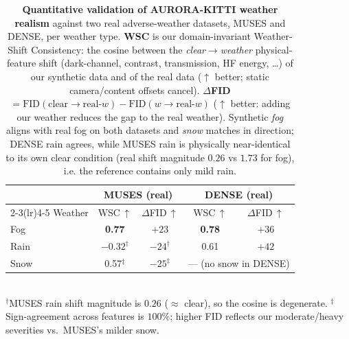 \begin{table}[t]
  \centering
  \small
  \setlength{\tabcolsep}{5pt}
  \caption{\textbf{Quantitative validation of AURORA-KITTI weather realism} against two real
  adverse-weather datasets, MUSES and DENSE, per weather type. \textbf{WSC} is our domain-invariant
  Weather-Shift Consistency: the cosine between the \emph{clear$\to$weather} physical-feature shift
  (dark-channel, contrast, transmission, HF energy, \dots) of our synthetic data and of the real data
  ($\uparrow$ better; static camera/content offsets cancel). \textbf{$\Delta$FID} $=
  \mathrm{FID}(\text{clear}\!\to\!\text{real-}w)-\mathrm{FID}(w\!\to\!\text{real-}w)$ ($\uparrow$ better:
  adding our weather reduces the gap to the real weather). Synthetic \emph{fog} aligns with real fog on
  both datasets and \emph{snow} matches in direction; DENSE rain agrees, while MUSES rain is physically
  near-identical to its own clear condition (real shift magnitude $0.26$ vs $1.73$ for fog), i.e. the
  reference contains only mild rain.}
  \begin{tabular}{l cc cc}
    \toprule
    & \multicolumn{2}{c}{\textbf{MUSES} (real)} & \multicolumn{2}{c}{\textbf{DENSE} (real)} \\
    \cmidrule(lr){2-3}\cmidrule(lr){4-5}
    Weather & WSC\,$\uparrow$ & $\Delta$FID\,$\uparrow$ & WSC\,$\uparrow$ & $\Delta$FID\,$\uparrow$ \\
    \midrule
    Fog  & \textbf{0.77} & $+23$ & \textbf{0.78} & $+36$ \\
    Rain & $-0.32^{\dagger}$ & $-24^{\dagger}$ & 0.61 & $+42$ \\
    Snow & 0.57$^{\ddagger}$ & $-25^{\ddagger}$ & \multicolumn{2}{c}{— (no snow in DENSE)} \\
    \bottomrule
  \end{tabular}
  \\[2pt]
  {\footnotesize $^{\dagger}$MUSES rain shift magnitude is $0.26$ ($\approx$ clear), so the cosine is
  degenerate. $^{\ddagger}$Sign-agreement across features is $100\%$; higher FID reflects our
  moderate/heavy severities vs.\ MUSES's milder snow.}
  \label{tab:realism}
\end{table}
